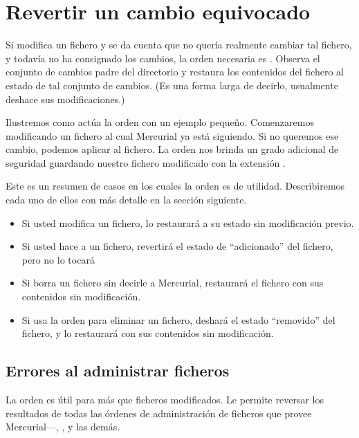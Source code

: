 \section{Revertir un cambio equivocado}

Si modifica un fichero y se da cuenta que no quería realmente cambiar
tal fichero, y todavía no ha consignado los cambios, la orden
necesaria es . Observa el conjunto de cambios padre del
directorio y restaura los contenidos del fichero al estado de tal
conjunto de cambios. (Es una forma larga de decirlo, usualmente
deshace sus modificaciones.)

Ilustremos como actúa la orden  con un ejemplo
pequeño. Comenzaremos modificando un fichero al cual Mercurial ya está
siguiendo.
Si no queremos ese cambio, podemos aplicar  al fichero.
La orden  nos brinda un grado adicional de seguridad
guardando nuestro fichero modificado con la extensión .

Este es un resumen de casos en los cuales la orden  es
de utilidad. Describiremos cada uno de ellos con más detalle en la
sección siguiente.
\begin{itemize}
\item Si usted modifica un fichero, lo restaurará a su estado sin
  modificación previo.
\item Si usted hace  a un fichero, revertirá el estado de
  ``adicionado'' del fichero, pero no lo tocará
\item Si borra un fichero sin decirle a Mercurial, restaurará el
  fichero con sus contenidos sin modificación.
\item Si usa la orden  para eliminar un fichero, deshará
  el estado ``removido'' del fichero, y lo restaurará con sus
  contenidos sin modificación.
\end{itemize}

\subsection{Errores al administrar ficheros}
\label{sec:undo:mgmt}

La orden  es útil para más que ficheros modificados. Le
permite reversar los resultados de todas las órdenes de administración
de ficheros que provee Mercurial---, , y las
demás.


